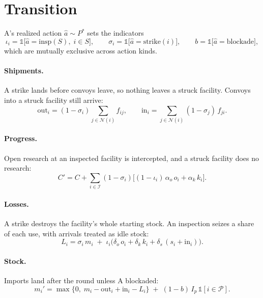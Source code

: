 \documentclass[11pt]{article}
\newcommand{\I}{\mathcal{I}}
\newcommand{\Nb}{\mathcal{N}}
\newcommand{\Ports}{\mathcal{P}}
\newcommand{\ind}{\mathbb{1}}
\newcommand{\insp}{\mathrm{insp}}
\newcommand{\strike}{\mathrm{strike}}
\newcommand{\blockade}{\mathrm{blockade}}
\begin{document}
\section{Transition}
\label{sec:transition}

A's realized action $\hat a \sim P^*$ sets the indicators
\begin{equation}
  \iota_i = \ind\big[\hat a = \insp(S), \; i \in S\big], \qquad
  \sigma_i = \ind\big[\hat a = \strike(i)\big], \qquad
  b = \ind\big[\hat a = \blockade\big],
\end{equation}
which are mutually exclusive across action kinds.

\paragraph{Shipments.}
A strike lands before convoys leave, so nothing leaves a struck facility. Convoys into a struck
facility still arrive:
\begin{equation}
  \mathrm{out}_i = ( 1 - \sigma_i ) \sum_{j \in \Nb(i)} f_{ij}, \qquad
  \mathrm{in}_i = \sum_{j \in \Nb(i)} ( 1 - \sigma_j ) \, f_{ji} .
\end{equation}

\paragraph{Progress.}
Open research at an inspected facility is intercepted, and a struck facility does no research:
\begin{equation}
  C' = C + \sum_{i \in \I} ( 1 - \sigma_i ) \Big[ ( 1 - \iota_i ) \, \alpha_o \, o_i + \alpha_k \, k_i \Big] .
\end{equation}

\paragraph{Losses.}
A strike destroys the facility's whole starting stock. An inspection seizes a share of each use,
with arrivals treated as idle stock:
\begin{equation}
  L_i = \sigma_i \, m_i
  \;+\; \iota_i \Big( \delta_o \, o_i + \delta_k \, k_i + \delta_s \, ( s_i + \mathrm{in}_i ) \Big) .
\end{equation}

\paragraph{Stock.}
Imports land after the round unless A blockaded:
\begin{equation}
  m_i' = \max\big\{ 0, \; m_i - \mathrm{out}_i + \mathrm{in}_i - L_i \big\}
  \;+\; ( 1 - b ) \, I_p \, \ind[i \in \Ports] .
\end{equation}
\end{document}
